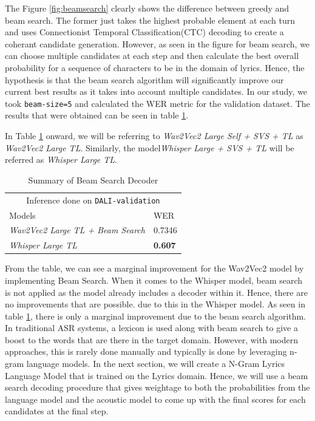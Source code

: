 The Figure \ref{fig:beamsearch} clearly shows the difference between greedy and beam search. The former just takes the highest probable element at each turn and uses Connectionist Temporal Classification(CTC) decoding to create a coherant candidate generation. However, as seen in the figure for beam search, we can choose multiple candidates at each step and then calculate the best overall probability for a sequence of characters to be in the domain of lyrics. Hence, the hypothesis is that the beam search algorithm will significantly improve our current best results as it takes into account multiple candidates. In our study, we took \texttt{beam-size=5} and calculated the WER metric for the validation dataset. The results that were obtained can be seen in table \ref{beamsearch-table}. 

In Table \ref{beamsearch-table} onward, we will be referring to \textit{Wav2Vec2 Large Self + SVS + TL} as \textit{Wav2Vec2 Large TL}. Similarly, the model\textit{Whisper Large + SVS + TL} will be referred as \textit{Whisper Large TL}. \\

\renewcommand{\arraystretch}{2}
\setlength{\arrayrulewidth}{0.3mm}
\begin{table}[H]
\small
\begin{center}
\begin{tabular}{ |p{7cm}| p{3cm}| }
\multicolumn{2}{c}{Inference done on \texttt{DALI-validation}} \\
\cline{1-2}
 Models     & WER  \\
\hline  \hline
 \textit{Wav2Vec2 Large TL + Beam Search}   &  0.7346  \\
 \textit{Whisper Large TL}  &  \textbf{0.607}  \\
\hline  \hline
\end{tabular} 
\caption{\label{beamsearch-table} Summary of Beam Search Decoder}
\end{center}
\end{table}



From the table, we can see a marginal improvement for the Wav2Vec2 model by implementing Beam Search. When it comes to the Whisper model, beam search is not applied as the model already includes a decoder within it. Hence, there are no improvements that are possible. due to this in the Whisper model. As seen in table \ref{beamsearch-table}, there is only a marginal improvement due to the beam search algorithm. In traditional ASR systems, a lexicon is used along with beam search to give a boost to the words that are there in the target domain. However, with modern approaches, this is rarely done manually and typically is done by leveraging n-gram language models. In the next section, we will create a N-Gram Lyrics Language Model that is trained on the Lyrics domain. Hence, we will use a beam search decoding procedure that gives weightage to both the probabilities from the language model and the acoustic model to come up with the final scores for each candidates at the final step.

